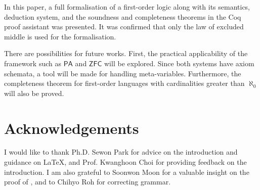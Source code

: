 \documentclass[twocolumn]{article}
\theoremstyle{definition}
\theoremstyle{definition}
\theoremstyle{definition}
\theoremstyle{definition}
\theoremstyle{definition}
\theoremstyle{definition}
\theoremstyle{definition}
\newcommand{\0}{\texttt{0}}
\newcommand{\1}{\texttt{1}}
\begin{document}
In this paper, a full formalisation of a first-order logic along with its semantics, deduction system, and the soundness and completeness theorems in the Coq proof assistant was presented. It was confirmed that only the law of excluded middle is used for the formalisation.

There are possibilities for future works. First, the practical applicability of the framework such as $\mathsf{PA}$ and $\mathsf{ZFC}$ will be explored. Since both systems have axiom schemata, a tool will be made for handling meta-variables. Furthermore, the completeness theorem for first-order languages with cardinalities greater than $\aleph_0$ will also be proved.

\section*{Acknowledgements}
\label{s:Acknowledgements}

I would like to thank Ph.D. Sewon Park for advice on the introduction and guidance on \LaTeX, and Prof. Kwanghoon Choi for providing feedback on the introduction.
I am also grateful to Soonwon Moon for a valuable insight on the proof of , and to Chihyo Roh for correcting grammar.



\end{document}
